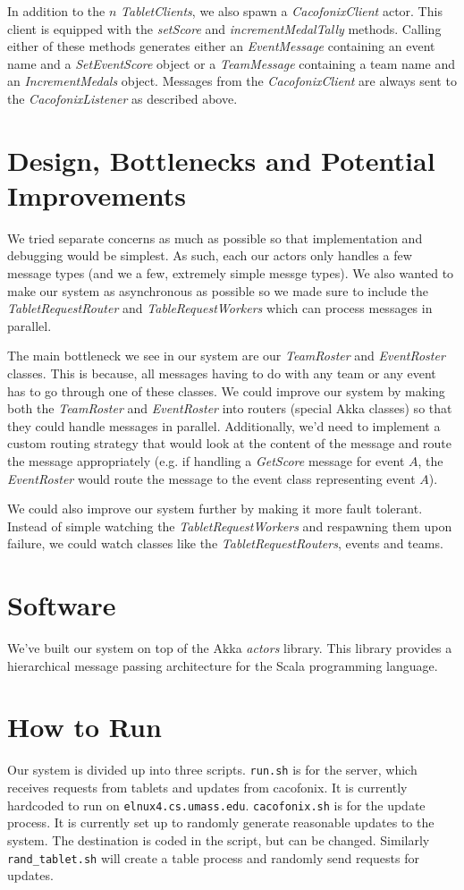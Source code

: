 \documentclass[11pt]{article}
\begin{document}
In addition to the $n$ \emph{TabletClients}, we also spawn a
\emph{CacofonixClient} actor.  This client is equipped with the
\emph{setScore} and \emph{incrementMedalTally} methods.  Calling
either of these methods generates either an \emph{EventMessage}
containing an event name and a \emph{SetEventScore} object or a
\emph{TeamMessage} containing a team name and an
\emph{IncrementMedals} object.  Messages from the
\emph{CacofonixClient} are always sent to the \emph{CacofonixListener}
as described above.

\section{Design, Bottlenecks and Potential Improvements}
We tried separate concerns as much as possible so that implementation
and debugging would be simplest.  As such, each our actors only
handles a few message types (and we a few, extremely simple
messge types).  We also wanted to make our system as
asynchronous as possible so we made sure to include the
\emph{TabletRequestRouter} and \emph{TableRequestWorkers} which can
process messages in parallel.

The main bottleneck we see in our system are our \emph{TeamRoster} and
\emph{EventRoster} classes.  This is because, all messages having to
do with any team or any event has to go through one of these classes.
We could improve our system by making both the \emph{TeamRoster} and
\emph{EventRoster} into routers (special Akka classes) so that they
could handle messages in parallel.  Additionally, we'd need to
implement a custom routing strategy that would look at the content of
the message and route the message appropriately (e.g. if handling a
\emph{GetScore} message for event $A$, the \emph{EventRoster} would
route the message to the event class representing event $A$).

We could also improve our system further by making it more fault
tolerant.  Instead of simple watching the \emph{TabletRequestWorkers}
and respawning them upon failure, we could watch classes like the
\emph{TabletRequestRouters}, events and teams.

\section{Software}
We've built our system on top of the Akka \emph{actors} library.  This
library provides a hierarchical message passing architecture for the
Scala programming language.

\section{How to Run}

Our system is divided up into three scripts. \texttt{run.sh} is for the server, which receives requests from tablets and updates from cacofonix. It is currently hardcoded to run on \texttt{elnux4.cs.umass.edu}. \texttt{cacofonix.sh} is for the update process. It is currently set up to randomly generate reasonable updates to the system. The destination is coded in the script, but can be changed. Similarly \texttt{rand_tablet.sh} will create a table process and randomly send requests for updates. 
\end{document}
